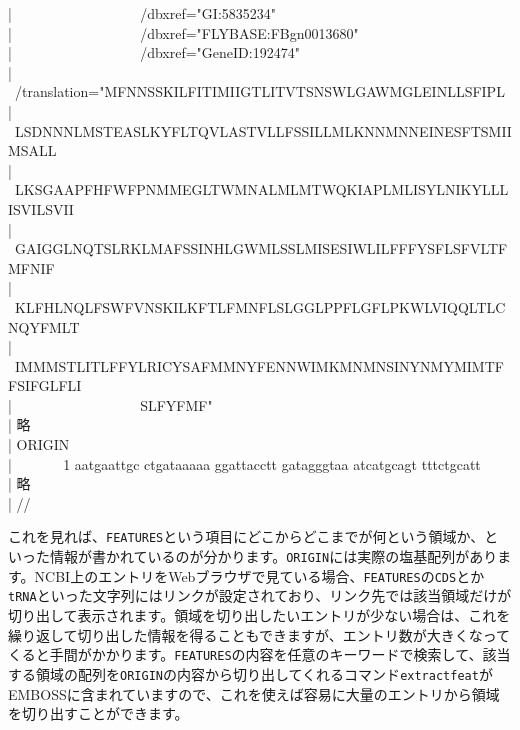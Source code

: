 \documentclass[titlepage,10pt,a4paper]{jsbook}
\newenvironment{content}{\begin{shaded}\vspace{-1em}\raggedright\ttfamily\footnotesize\setlength{\baselineskip}{1.4em}}{\end{shaded}\vspace{-1em}}
\begin{document}
\begin{content}
| ~ ~ ~ ~ ~ ~ ~ ~ ~ ~ ~/db{\textunderscore}xref="GI:5835234"\\
| ~ ~ ~ ~ ~ ~ ~ ~ ~ ~ ~/db{\textunderscore}xref="FLYBASE:FBgn0013680"\\
| ~ ~ ~ ~ ~ ~ ~ ~ ~ ~ ~/db{\textunderscore}xref="GeneID:192474"\\
| ~ ~ ~ ~ ~ ~ ~ ~ ~ ~ ~/translation="MFNNSSKILFITIMIIGTLITVTSNSWLGAWMGLEINLLSFIPL\\
| ~ ~ ~ ~ ~ ~ ~ ~ ~ ~ ~LSDNNNLMSTEASLKYFLTQVLASTVLLFSSILLMLKNNMNNEINESFTSMIIMSALL\\
| ~ ~ ~ ~ ~ ~ ~ ~ ~ ~ ~LKSGAAPFHFWFPNMMEGLTWMNALMLMTWQKIAPLMLISYLNIKYLLLISVILSVII\\
| ~ ~ ~ ~ ~ ~ ~ ~ ~ ~ ~GAIGGLNQTSLRKLMAFSSINHLGWMLSSLMISESIWLILFFFYSFLSFVLTFMFNIF\\
| ~ ~ ~ ~ ~ ~ ~ ~ ~ ~ ~KLFHLNQLFSWFVNSKILKFTLFMNFLSLGGLPPFLGFLPKWLVIQQLTLCNQYFMLT\\
| ~ ~ ~ ~ ~ ~ ~ ~ ~ ~ ~IMMMSTLITLFFYLRICYSAFMMNYFENNWIMKMNMNSINYNMYMIMTFFSIFGLFLI\\
| ~ ~ ~ ~ ~ ~ ~ ~ ~ ~ ~SLFYFMF"\\
| 略\\
| ORIGIN~ ~ ~ \\
| ~ ~ ~ ~ 1 aatgaattgc ctgataaaaa ggattacctt gatagggtaa atcatgcagt tttctgcatt\\
| 略\\
| //
\end{content}
これを見れば、\texttt{FEATURES}という項目にどこからどこまでが何という領域か、といった情報が書かれているのが分かります。\texttt{ORIGIN}には実際の塩基配列があります。NCBI上のエントリをWebブラウザで見ている場合、\texttt{FEATURES}の\texttt{CDS}とか\texttt{tRNA}といった文字列にはリンクが設定されており、リンク先では該当領域だけが切り出して表示されます。領域を切り出したいエントリが少ない場合は、これを繰り返して切り出した情報を得ることもできますが、エントリ数が大きくなってくると手間がかかります。\texttt{FEATURES}の内容を任意のキーワードで検索して、該当する領域の配列を\texttt{ORIGIN}の内容から切り出してくれるコマンド\texttt{extractfeat}がEMBOSSに含まれていますので、これを使えば容易に大量のエントリから領域を切り出すことができます。
\end{document}
